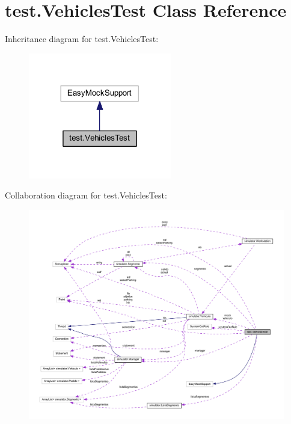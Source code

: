 \hypertarget{classtest_1_1_vehicles_test}{}\section{test.\+Vehicles\+Test Class Reference}
\label{classtest_1_1_vehicles_test}


Inheritance diagram for test.\+Vehicles\+Test\+:\nopagebreak
\begin{figure}[H]
\begin{center}
\leavevmode
\includegraphics[width=177pt]{classtest_1_1_vehicles_test__inherit__graph}
\end{center}
\end{figure}


Collaboration diagram for test.\+Vehicles\+Test\+:\nopagebreak
\begin{figure}[H]
\begin{center}
\leavevmode
\includegraphics[width=350pt]{classtest_1_1_vehicles_test__coll__graph}
\end{center}
\end{figure}
